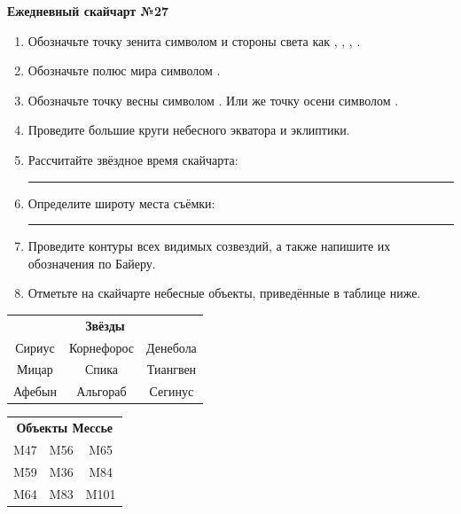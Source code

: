 \documentclass{./SAS-class-skygen}
\begin{document}
    
    
    
	\begin{center}
		\large\textbf{Ежедневный скайчарт №27}
	\end{center}

	\begin{enumerate}
		\item Обозначьте точку зенита символом  и стороны света как , , , .
		\item Обозначьте полюс мира символом .
		\item Обозначьте точку весны символом \Aries. Или же точку осени символом \Libra.
		\item Проведите большие круги небесного экватора и эклиптики.
		\item Рассчитайте звёздное время скайчарта: \rule{2cm}{0.4pt}
		\item Определите широту места съёмки: \rule{2cm}{0.4pt}
		\item Проведите контуры всех видимых созвездий, а также напишите их обозначения по Байеру.
		\item Отметьте на скайчарте небесные объекты, приведённые в таблице ниже.
	\end{enumerate}
	
    \vspace{0.5cm}

    \begin{table}[h!]
    \centering
    \begin{tabular}{ccc}
    \multicolumn{3}{c}{\textbf{Звёзды}} \\ Сириус & Корнефорос & Денебола \\
Мицар & Спика & Тиангвен \\
Афебын & Альгораб & Сегинус \\

\end{tabular}
    \hfill
    \begin{tabular}{ccc}
    \multicolumn{3}{c}{\textbf{Объекты Мессье}} \\ M47 & M56 & M65 \\
M59 & M36 & M84 \\
M64 & M83 & M101 \\

\end{tabular}
    \end{table}
	
\end{document}

